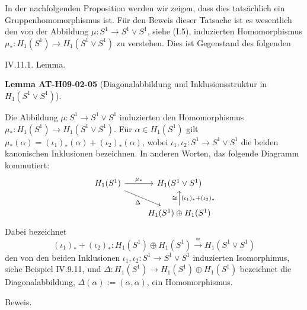 \documentclass[10pt, letterpaper]{article}
\newcommand{\CustomHeading}[3]{%
  \par\medskip\noindent%
  \textbf{#1 #2} \textnormal{(#3)}.\enskip%
}
\newenvironment{LEM}[2]{\begin{unitbox}\CustomHeading{Lemma}{#1}{#2}}{\end{unitbox}}
\begin{document}
In der nachfolgenden Proposition werden wir zeigen, dass dies tatsächlich ein Gruppenhomomorphismus ist. Für den Beweis dieser Tatsache ist es wesentlich den von der Abbildung $\mu: S^1 \rightarrow S^1 \vee S^1$, siehe (I.5), induzierten Homomorphismus $\mu_*: H_1\left(S^1\right) \rightarrow H_1\left(S^1 \vee S^1\right)$ zu verstehen. Dies ist Gegenstand des folgenden



IV.11.1. Lemma. 

\begin{LEM}{AT-H09-02-05}{Diagonalabbildung und Inklusionsstruktur in $H_1\left(S^1 \vee S^1\right)$}
Die Abbildung $\mu: S^1 \longrightarrow S^1 \vee S^1$ induzierten den Homomorphismus $\mu_*: H_1(S^1) \longrightarrow H_1(S^1 \vee S^1)$. Für $\alpha \in H_1\left(S^1\right)$ gilt $\mu_*(\alpha)=\left(\iota_1\right)_*(\alpha)+\left(\iota_2\right)_*(\alpha)$, wobei $\iota_1, \iota_2: S^1 \rightarrow S^1 \vee S^1$ die beiden kanonischen Inklusionen bezeichnen. In anderen Worten, das folgende Diagramm kommutiert:
\[
\begin{tikzcd}
H_1(S^1) \arrow[r, "\mu_*"] \arrow[dr, "\Delta"'] & H_1(S^1 \vee S^1) \\
& H_1(S^1) \oplus H_1(S^1) \arrow[u, "(\iota_1)_* + (\iota_2)_*"', "\cong"]
\end{tikzcd}
\]
Dabei bezeichnet 
$$\left(\iota_1\right)_*+\left(\iota_2\right)_*: H_1\left(S^1\right) \oplus H_1\left(S^1\right) \stackrel{\cong}{\rightarrow} H_1\left(S^1 \vee S^1\right)$$ 
den von den beiden Inklusionen $\iota_1, \iota_2: S^1 \rightarrow S^1 \vee S^1$ induzierten Isomorphimus, siehe Beispiel IV.9.11, und $\Delta: H_1\left(S^1\right) \rightarrow H_1\left(S^1\right) \oplus H_1\left(S^1\right)$ bezeichnet die Diagonalabbildung, $\Delta(\alpha):=(\alpha, \alpha)$, ein Homomorphismus.
\end{LEM}



Beweis. 
\end{document}
